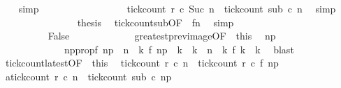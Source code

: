 \begin{isabellebody}
\ {}\ \isamarkupfalse%
\ simp\isanewline
\ \ \ \ \ \ \ \ \ \ \ \ \ \ \isamarkupfalse%
\ \isamarkupfalse%
\ {\isacartoucheopen}tick{\isacharunderscore}count\ r\ c\ {\isacharparenleft}Suc\ n{\isacharparenright}\ {\isasymle}\ tick{\isacharunderscore}count\ sub\ c\ n\ \isamarkupfalse%
\ simp\isanewline
\ \ \ \ \ \ \ \ \ \ \ \ \ \ \isamarkupfalse%
\ {\isacharquery}thesis\ \isamarkupfalse%
\ tick{\isacharunderscore}count{\isacharunderscore}sub{\isacharbrackleft}OF\ {\isacharasterisk}{\isacharbrackright}\ fn\ \isamarkupfalse%
\ simp\isanewline
\ \ \ \ \ \ \ \ \ \ \isamarkupfalse%
\isanewline
\ \ \ \ \ \ \isamarkupfalse%
\isanewline
\ \ \ \ \ \ \ \ \isamarkupfalse%
\ False\ %
\isanewline
\ \ \ \ \ \ \ \ \ \ \isamarkupfalse%
\ greatest{\isacharunderscore}prev{\isacharunderscore}image{\isacharbrackleft}OF\ {\isacharasterisk}\ this{\isacharbrackright}\ \isamarkupfalse%
\ n\isactrlsub p\isanewline
\ \ \ \ \ \ \ \ \ \ \ \ \ np{\isacharunderscore}prop{\isacharcolon}{\isacartoucheopen}f\ n\isactrlsub p\ {\isacharless}\ n\ {\isasymand}\ {\isacharparenleft}{\isasymforall}k{\isachardot}\ f\ n\isactrlsub p\ {\isacharless}\ k\ {\isasymand}\ k\ {\isasymle}\ n\ {\isasymlongrightarrow}\ {\isacharparenleft}{\isasymnexists}k\ f\ k\ {\isacharequal}\ k{\isacharparenright}{\isacharparenright}{\isacartoucheclose}\ \isamarkupfalse%
\ blast\isanewline
\ \ \ \ \ \ \ \ \ \ \isamarkupfalse%
\ tick{\isacharunderscore}count{\isacharunderscore}latest{\isacharbrackleft}OF\ {\isacharasterisk}\ this{\isacharbrackright}\ \isamarkupfalse%
\ {\isacartoucheopen}tick{\isacharunderscore}count\ r\ c\ n\ {\isacharequal}\ tick{\isacharunderscore}count\ r\ c\ {\isacharparenleft}f\ n\isactrlsub p{\isacharparenright}{\isacartoucheclose}\ \isacommand{{\isachardot}}\isamarkupfalse%
\ \isanewline
\ \ \ \ \ \ \ \ \ \ \isamarkupfalse%
\ a{\isacharcolon}{\isacartoucheopen}tick{\isacharunderscore}count\ r\ c\ n\ {\isacharequal}\ tick{\isacharunderscore}count\ sub\ c\ n\isactrlsub p{\isacartoucheclose}\ \isamarkupfalse%

\end{isabellebody}
